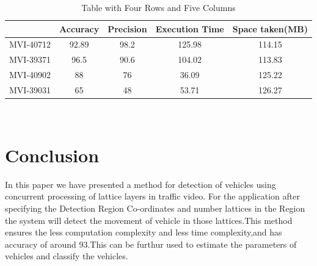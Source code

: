 \documentclass[conference]{IEEEtran}
\begin{document}
\begin{table}[h]
    \centering
    \begin{tabular}{|c|c|c|c|c|}
        \hline
             & Accuracy & Precision & Execution Time & Space taken(MB) \\
        \hline
        MVI-40712 & 92.89 & 98.2 & 125.98 & 114.15 \\
        \hline
        MVI-39371 & 96.5 & 90.6 & 104.02 & 113.83 \\
        \hline
        MVI-40902 & 88 & 76 & 36.09 & 125.22 \\
        \hline
        MVI-39031 & 65 & 48 & 53.71 & 126.27 \\
        \hline
    \end{tabular}
    \\[1em]
    \caption{Table with Four Rows and Five Columns}
    \label{tab:four-rows-five-columns}
\end{table}

\section{Conclusion}
In this paper we have presented a method for detection of vehicles using concurrent processing of lattice layers in traffic video.
For the application after specifying the Detection Region Co-ordinates and number lattices in the Region the system will detect the movement of vehicle in those lattices.This method ensures the less computation complexity and less time complexity,and has accuracy of around 93.This can be furthur used to estimate the parameters of vehicles and classify the vehicles.
\end{document}
